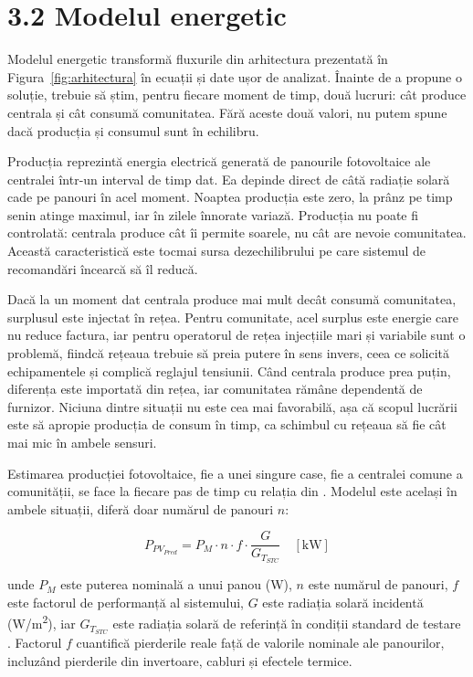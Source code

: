 \documentclass[12pt,a4paper]{report}
\begin{document}
\section*{3.2 Modelul energetic}

Modelul energetic transformă fluxurile din arhitectura prezentată în Figura~\ref{fig:arhitectura} în ecuații și date ușor de analizat. Înainte de a propune o soluție, trebuie să știm, pentru fiecare moment de timp, două lucruri: cât produce centrala și cât consumă comunitatea. Fără aceste două valori, nu putem spune dacă producția și consumul sunt în echilibru.

Producția reprezintă energia electrică generată de panourile fotovoltaice ale centralei într-un interval de timp dat. Ea depinde direct de câtă radiație solară cade pe panouri în acel moment. Noaptea producția este zero, la prânz pe timp senin atinge maximul, iar în zilele înnorate variază. Producția nu poate fi controlată: centrala produce cât îi permite soarele, nu cât are nevoie comunitatea. Această caracteristică este tocmai sursa dezechilibrului pe care sistemul de recomandări încearcă să îl reducă.

Dacă la un moment dat centrala produce mai mult decât consumă comunitatea, surplusul este injectat în rețea. Pentru comunitate, acel surplus este energie care nu reduce factura, iar pentru operatorul de rețea injecțiile mari și variabile sunt o problemă, fiindcă rețeaua trebuie să preia putere în sens invers, ceea ce solicită echipamentele și complică reglajul tensiunii. Când centrala produce prea puțin, diferența este importată din rețea, iar comunitatea rămâne dependentă de furnizor. Niciuna dintre situații nu este cea mai favorabilă, așa că scopul lucrării este să apropie producția de consum în timp, ca schimbul cu rețeaua să fie cât mai mic în ambele sensuri.

Estimarea producției fotovoltaice, fie a unei singure case, fie a centralei comune a comunității, se face la fiecare pas de timp cu relația din \cite{simoiu2021jcp}. Modelul este același în ambele situații, diferă doar numărul de panouri $n$:

\begin{equation}
  P_{PV_{Pred}} = P_M \cdot n \cdot f \cdot \frac{G}{G_{T_{STC}}} \quad [\text{kW}]
  \label{eq:productie}
\end{equation}

unde $P_M$ este puterea nominală a unui panou (W), $n$ este numărul de panouri, $f$ este factorul de performanță al sistemului, $G$ este radiația solară incidentă (W/m\textsuperscript{2}), iar $G_{T_{STC}}$ este radiația solară de referință în condiții standard de testare \cite{duffie2020solar}. Factorul $f$ cuantifică pierderile reale față de valorile nominale ale panourilor, incluzând pierderile din invertoare, cabluri și efectele termice.
\end{document}
